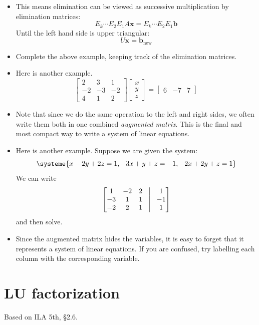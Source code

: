 \documentclass[11pt,oneside]{amsbook}
\theoremstyle{definition}
\theoremstyle{plain}
\theoremstyle{definition}
\theoremstyle{remark}
\numberwithin{equation}{section}
\numberwithin{figure}{section}
\begin{document}
\begin{itemize}
\begin{itemize}
  \end{itemize}
\item This means elimination can be viewed as successive multiplication by elimination matrices:
  \[E_k\cdots E_2E_1A\mathbf{x}=E_k\cdots E_2E_1\mathbf{b}
  \]
  Until the left hand side is upper triangular:
  \[U\mathbf{x}=\mathbf{b}_{\text{new}}
  \]
\item Complete the above example, keeping track of the elimination matrices.
\item Here is another example.
  \[\begin{bmatrix}2&3&1\\-2&-3&-2\\4&1&2\end{bmatrix}
    \begin{bmatrix}x\\y\\z\end{bmatrix}
    =\begin{bmatrix}6&-7&7\end{bmatrix}
  \]
\item Note that since we do the same operation to the left and right sides, we often write them both in one combined \emph{augmented matrix}. This is the final and most compact way to write a system of linear equations. 
\item Here is another example. Suppose we are given the system:
  \[\systeme{x-2y+2z=1,-3x+y+z=-1,-2x+2y+z=1}
  \]
  We can write
  \[\begin{bmatrix}
      1&-2&2&\vline&1\\
      -3&1&1&\vline&-1\\
      -2&2&1&\vline&1
    \end{bmatrix}
  \]
  and then solve.
\item Since the augmented matrix hides the variables, it is easy to forget that it represents a system of linear equations. If you are confused, try labelling each column with the corresponding variable.
\end{itemize}

\newpage
\section{LU factorization}

Based on ILA 5th, \S 2.6.
\end{document}
